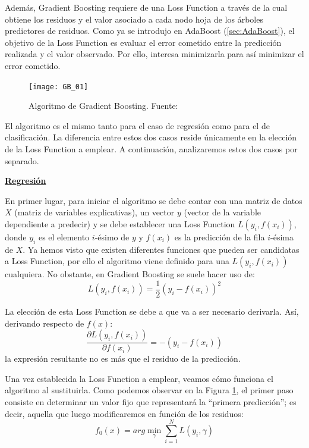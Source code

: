 \documentclass[12pt,twoside]{article}
\begin{document}
Además, Gradient Boosting requiere de una Loss Function a través de la cual obtiene los residuos y el valor asociado a cada nodo hoja de los árboles predictores de residuos. Como ya se introdujo en AdaBoost (\ref{sec:AdaBoost}), el objetivo de la Loss Function es evaluar el error cometido entre la predicción realizada y el valor observado. Por ello, interesa minimizarla para así minimizar el error cometido.


\begin{figure}[H]
\centering
\texttt{[image: GB\_01]}
\caption{Algoritmo de Gradient Boosting. Fuente: \cite{FR04}}
\label{fig:GB_01}
\end{figure}

El algoritmo es el mismo tanto para el caso de regresión como para el de clasificación. La diferencia entre estos dos casos reside únicamente en la elección de la Loss Function a emplear. A continuación, analizaremos estos dos casos por separado.

\bigskip \bigskip 

\textbf{\underline{Regresión}}


En primer lugar, para iniciar el algoritmo se debe contar con una matriz de datos $X$ (matriz de variables explicativas), un vector $y$ (vector de la variable dependiente a predecir) y se debe establecer una Loss Function $L(y_i, f(x_i))$, donde $y_i$ es el elemento $i$-ésimo de $y$ y $f(x_i)$ es la predicción de la fila $i$-ésima de $X$. Ya hemos visto que existen diferentes funciones que pueden ser candidatas a Loss Function, por ello el algoritmo viene definido para una $L(y_i, f(x_i))$ cualquiera. No obstante, en Gradient Boosting se suele hacer uso de:
\begin{equation*}
L(y_i, f(x_i)) = \frac{1}{2}(y_i - f(x_i))^2
\end{equation*}

La elección de esta Loss Function se debe a que va a ser necesario derivarla. Así, derivando respecto de $f(x)$:
\begin{equation*}
\frac{\partial L(y_i, f(x_i))}{\partial f(x_i)} = -(y_i -f(x_i))
\end{equation*}
\noindent
la expresión resultante no es más que el residuo de la predicción.

Una vez establecida la Loss Function a emplear, veamos cómo funciona el algoritmo al sustituirla. Como podemos observar en la Figura \ref{fig:GB_01}, el primer paso consiste en determinar un valor fijo que representará la ``primera predicción''; es decir, aquella que luego modificaremos en función de los residuos:
\begin{equation*}
f_0(x) = arg\min_{\gamma} \sum_{i=1}^N L(y_i, \gamma)
\end{equation*}
\end{document}
